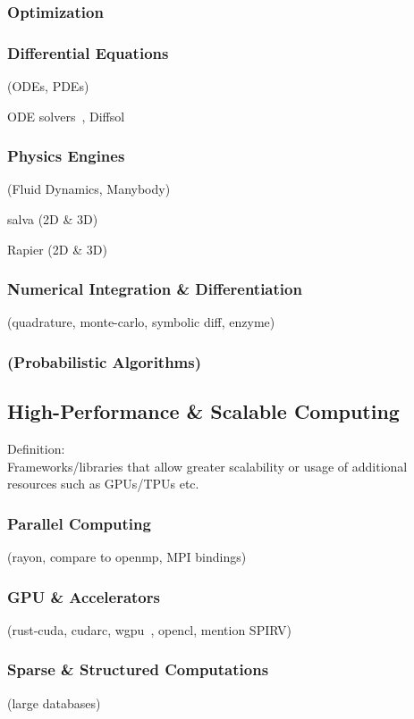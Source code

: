 \documentclass{article}
\begin{document}
\subsubsection{Optimization}
\subsubsection{Differential Equations}
(ODEs, PDEs)

ODE solvers~\cite{Renevey2024}, Diffsol

\subsubsection{Physics Engines}
(Fluid Dynamics, Manybody)

salva (2D \& 3D)~\cite{Crozet2024}

Rapier (2D \& 3D)~\cite{Crozet2025}

\subsubsection{Numerical Integration \& Differentiation}
(quadrature, monte-carlo, symbolic diff, enzyme)

\subsubsection{(Probabilistic Algorithms)}

\subsection{High-Performance \& Scalable Computing}
Definition:\\
Frameworks/libraries that allow greater scalability or usage of additional resources
such as GPUs/TPUs etc.

\subsubsection{Parallel Computing}
(rayon, compare to openmp, MPI bindings)

\subsubsection{GPU \& Accelerators}
(rust-cuda, cudarc, wgpu~\cite{Fitzgerald2025}, opencl, mention SPIRV)

\subsubsection{Sparse \& Structured Computations}
(large databases)
\end{document}
